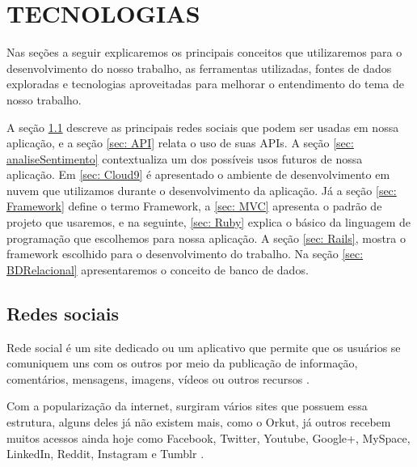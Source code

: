 \chapter{TECNOLOGIAS}
\label{cha: Conceituacaoo e Ideia Geral}

Nas seções a seguir explicaremos os principais conceitos que utilizaremos para o desenvolvimento do nosso trabalho, as ferramentas utilizadas, fontes de dados exploradas e tecnologias aproveitadas para melhorar o entendimento do tema de nosso trabalho. 

A seção \ref{sec: Redes sociais} descreve as principais redes sociais que podem ser usadas em nossa aplicação, e a seção \ref{sec: API} relata o uso de suas APIs.
A seção \ref{sec: analiseSentimento} contextualiza um dos possíveis usos futuros de nossa aplicação.
Em \ref{sec: Cloud9} é apresentado o ambiente de desenvolvimento em nuvem que utilizamos durante o desenvolvimento da aplicação.
Já a seção \ref{sec: Framework} define o termo Framework, a \ref{sec: MVC} apresenta o padrão de projeto que usaremos, e na seguinte, \ref{sec: Ruby} explica o básico da linguagem de programação que escolhemos para nossa aplicação.
A seção \ref{sec: Rails}, mostra o framework escolhido para o desenvolvimento do trabalho. 
Na seção \ref{sec: BDRelacional} apresentaremos o conceito de banco de dados. %

\section{Redes sociais}
\label{sec: Redes sociais}
Rede social é um site dedicado ou um aplicativo que permite que os usuários se comuniquem uns com os outros por meio da publicação de informação, comentários, mensagens, imagens, vídeos ou outros recursos \cite{socialNetworkDefinition}.

Com a popularização da internet, surgiram vários sites que possuem essa estrutura, alguns deles já não existem mais, como o Orkut, já outros recebem muitos acessos ainda hoje como Facebook, Twitter, Youtube, Google+, MySpace, LinkedIn, Reddit, Instagram e Tumblr \cite{wsj}.

